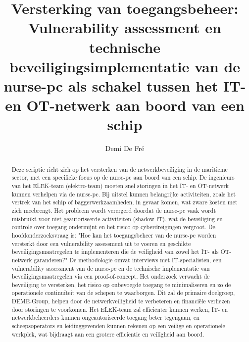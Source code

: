 \documentclass{hogent-article}
\title{Versterking van toegangsbeheer: Vulnerability assessment en 
technische beveiligingsimplementatie van de nurse-pc als schakel tussen het IT- en OT-netwerk aan boord van een schip}
\author{Demi De Fré}
\begin{document}
\begin{abstract}
  Deze scriptie richt zich op het versterken van de netwerkbeveiliging in de maritieme sector, met een specifieke focus op de 
  nurse-pc aan boord van een schip. De ingenieurs van het ELEK-team (elektro-team) moeten snel storingen in het IT- en OT-netwerk 
  kunnen verhelpen via de nurse-pc. Bij uitstel kunnen belangrijke activiteiten, zoals het vertrek van het schip of 
  baggerwerkzaamheden, in gevaar komen, wat zware kosten met zich meebrengt. Het probleem wordt verergerd doordat de nurse-pc 
  vaak wordt misbruikt voor niet-geautoriseerde activiteiten (shadow IT), wat de beveiliging en controle over toegang ondermijnt 
  en het risico op cyberdreigingen vergroot. De hoofdonderzoeksvraag is: "Hoe kan het toegangsbeheer van de nurse-pc worden 
  versterkt door een vulnerability assessment uit te voeren en geschikte beveiligingsmaatregelen te implementeren die de veiligheid 
  van zowel het IT- als OT-netwerk garanderen?" De methodologie omvat interviews met IT-specialisten, een vulnerability assessment 
  van de nurse-pc en de technische implementatie van beveiligingsmaatregelen via een proof-of-concept. Het onderzoek verwacht de 
  beveiliging te versterken, het risico op onbevoegde toegang te minimaliseren en zo de operationele continuïteit van de schepen 
  te waarborgen. Dit zal de primaire doelgroep, DEME-Group, helpen door de netwerkveiligheid te verbeteren en financiële verliezen 
  door storingen te voorkomen. Het ELEK-team zal efficiënter kunnen werken, IT- en netwerkbeheerders kunnen ongeautoriseerde toegang 
  beter tegengaan, en scheepsoperators en leidinggevenden kunnen rekenen op een veilige en operationele werkplek, wat bijdraagt aan 
  een grotere efficiëntie en veiligheid aan boord.
\end{abstract}

\tableofcontents



\printbibliography[heading=bibintoc]
\end{document}
